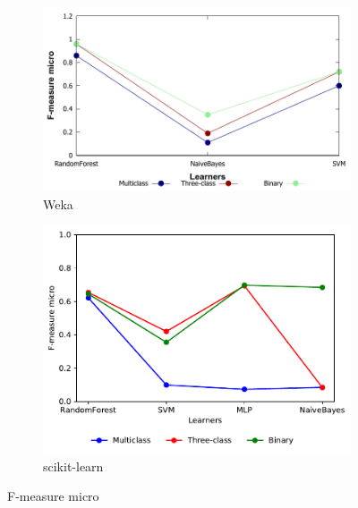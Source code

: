 \begin{figure}[H]
    \centering
    \begin{subfigure}[t]{0.5\textwidth}
        \includegraphics[width=\linewidth]{images/weka_f1micro}
        \caption{Weka}
    \end{subfigure}%
    \begin{subfigure}[t]{0.42\textwidth}
        \includegraphics[width=\linewidth, page = 1]{images/fmeasure}
        \caption{scikit-learn}
    \end{subfigure}
    \caption{F-measure micro}
    \label{fig:f1_micro}
\end{figure}

